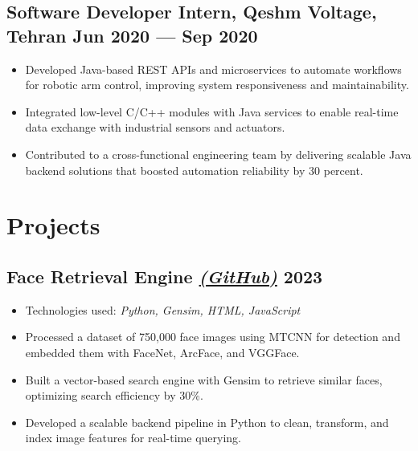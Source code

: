 \documentclass[a4,10pt]{article}
\newcommand{\subtext}[1]{
#1\par\vspace{-0.2cm}}
\newenvironment{zitemize}{
\begin{itemize}\itemsep0pt \parskip0pt \parsep1pt}
{\end{itemize}\vspace{-0.5cm}}
\begin{document}
\subsection*{Software Developer Intern, {\normalsize\normalfont Qeshm Voltage, Tehran} \hfill Jun 2020 --- Sep 2020} 
    \begin{zitemize}
        \item Developed Java-based REST APIs and microservices to automate workflows for robotic arm control, improving system responsiveness and maintainability.
        \item Integrated low-level C/C++ modules with Java services to enable real-time data exchange with industrial sensors and actuators.
        \item Contributed to a cross-functional engineering team by delivering scalable Java backend solutions that boosted automation reliability by 30 percent.
    \end{zitemize}



\section{Projects} 

\subsection*{\normalsize
\textbf{Face Retrieval Engine} 
\href{https://github.com/Erfanafshar/face-Image-retrieval}{\normalfont\textit{(GitHub)}} 
\hfill 2023}
\begin{zitemize}
    \item Technologies used: \textit{Python, Gensim, HTML, JavaScript}
    \item Processed a dataset of 750,000 face images using MTCNN for detection and embedded them with FaceNet, ArcFace, and VGGFace.
    \item Built a vector-based search engine with Gensim to retrieve similar faces, optimizing search efficiency by 30\%.
    \item Developed a scalable backend pipeline in Python to clean, transform, and index image features for real-time querying.
\end{zitemize}
\end{document}
